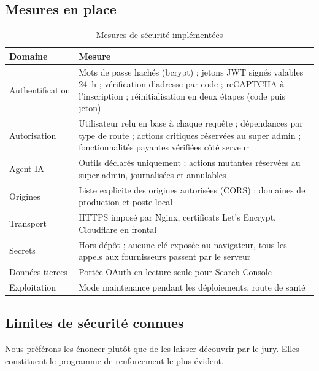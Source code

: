 \subsection{Mesures en place}
\begin{table}[htbp]
\centering
\small
\caption{Mesures de sécurité implémentées}\label{tab-securite}
\begin{tabularx}{\textwidth}{@{}p{3.2cm}X@{}}
\toprule
\textbf{Domaine} & \textbf{Mesure}\\
\midrule
Authentification & Mots de passe hachés (bcrypt) ; jetons JWT signés valables 24~h ; vérification d'adresse par code ; reCAPTCHA à l'inscription ; réinitialisation en deux étapes (code puis jeton)\\
Autorisation & Utilisateur relu en base à chaque requête ; dépendances par type de route ; actions critiques réservées au super admin ; fonctionnalités payantes vérifiées côté serveur\\
Agent IA & Outils déclarés uniquement ; actions mutantes réservées au super admin, journalisées et annulables\\
Origines & Liste explicite des origines autorisées (CORS) : domaines de production et poste local\\
Transport & HTTPS imposé par Nginx, certificats Let's Encrypt, Cloudflare en frontal\\
Secrets & Hors dépôt ; aucune clé exposée au navigateur, tous les appels aux fournisseurs passent par le serveur\\
Données tierces & Portée OAuth en lecture seule pour Search Console\\
Exploitation & Mode maintenance pendant les déploiements, route de santé\\
\bottomrule
\end{tabularx}
\end{table}

\subsection{Limites de sécurité connues}
Nous préférons les énoncer plutôt que de les laisser découvrir par le jury. Elles constituent le programme de renforcement le plus évident.

